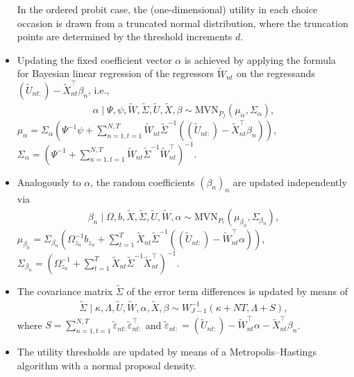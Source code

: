 \documentclass[article,shortnames]{jss}
\begin{document}
\begin{itemize}
  In the ordered probit case, the (one-dimensional) utility in each choice occasion is drawn from a truncated normal distribution, where the truncation points are determined by the threshold increments $d$.
  \item Updating the fixed coefficient vector $\alpha$ is achieved by applying the formula for Bayesian linear regression of the regressors $\tilde{W}_{nt}$ on the regressands $(\tilde{U}_{nt:})-\tilde{X}_{nt}^\top \beta_n$, i.e.,
  \begin{align*}
  \alpha \mid \Psi,\psi,\tilde{W},\tilde{\Sigma},\tilde{U},\tilde{X},\beta \sim \text{MVN}_{P_f}(\mu_\alpha,\Sigma_\alpha),
  \end{align*}
  $\mu_\alpha = \Sigma_\alpha (\Psi^{-1}\psi + \sum_{n=1,t=1}^{N,T} \tilde{W}_{nt} \tilde{\Sigma}^{-1} ((\tilde{U}_{nt:})-\tilde{X}_{nt}^\top \beta_n) )$, $\Sigma_\alpha = (\Psi^{-1} + \sum_{n=1,t=1}^{N,T} \tilde{W}_{nt}\tilde{\Sigma}^{-1} \tilde{W}_{nt}^\top )^{-1}$.
  \item Analogously to $\alpha$, the random coefficients $(\beta_n)_n$ are updated independently via
  \begin{align*}
  \beta_n \mid \Omega,b,\tilde{X},\tilde{\Sigma},\tilde{U},\tilde{W},\alpha \sim \text{MVN}_{P_r}(\mu_{\beta_n},\Sigma_{\beta_n}),
  \end{align*}
  $\mu_{\beta_n} = \Sigma_{\beta_n} (\Omega_{z_n}^{-1}b_{z_n} + \sum_{t=1}^{T} \tilde{X}_{nt} \tilde{\Sigma}^{-1} ((\tilde{U}_{nt:})-\tilde{W}_{nt}^\top \alpha) )$, $\Sigma_{\beta_n} = (\Omega_{z_n}^{-1} + \sum_{t=1}^{T} \tilde{X}_{nt}\tilde{\Sigma}^{-1} \tilde{X}_{nt}^\top )^{-1}$.
    \item The covariance matrix $\tilde{\Sigma}$ of the error term differences is updated by means of
  \begin{align*}
  \tilde{\Sigma} \mid \kappa,\Lambda,\tilde{U},\tilde{W},\alpha,\tilde{X},\beta \sim W^{-1}_{J-1}(\kappa+NT,\Lambda+S),
  \end{align*}
  where $S = \sum_{n=1,t=1}^{N,T} \tilde{\varepsilon}_{nt:} \tilde{\varepsilon}_{nt:}^\top$ and $\tilde{\varepsilon}_{nt:} = (\tilde{U}_{nt:}) - \tilde{W}_{nt}^\top \alpha - \tilde{X}_{nt}^\top \beta_n$.
  \item The utility thresholds  are updated by means of a Metropolis–Hastings algorithm with a normal proposal density.
\end{itemize}
\end{document}
